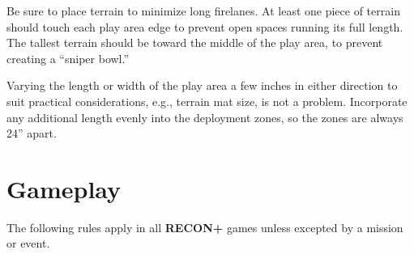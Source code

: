\documentclass[14pt,dvipsnames]{extarticle}
\newcommand{\missionrule}[1]{\noindent\textbf{#1}\xspace}
\newenvironment{squishitemize}
{\begin{list}{$\bullet$}{%
    \setlength{\itemsep}{2pt}%
    \setlength{\parsep}{2pt}%
    \setlength{\topsep}{2pt}%
    \setlength{\parskip}{0pt} %
    \renewcommand{\labelitemi}{--}}}
  {\end{list}}
\newcommand{\reconplus}{\textbf{RECON+}\xspace}
\begin{document}
Be sure to place terrain to minimize long firelanes.  At least one
piece of terrain should touch each play area edge to prevent open
spaces running its full length.  The tallest terrain should be toward
the middle of the play area, to prevent creating a ``sniper bowl.''

\begin{recon}
  Varying the length or width of the play area a few inches in either
  direction to suit practical considerations, e.g., terrain mat size,
  is not a problem.  Incorporate any additional length evenly into the
  deployment zones, so the zones are always 24'' apart.
\end{recon}


\section{Gameplay}

The following rules apply in all \reconplus games unless excepted by a
mission or event.

%
%
%
%
%
%
%
%
%


\end{document}
